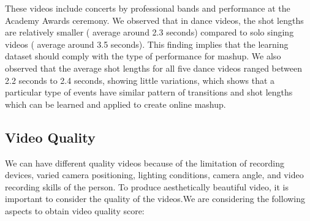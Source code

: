 \documentclass{clsfile}
\begin{document}
These videos include concerts by professional bands and performance at the Academy Awards ceremony. We observed that in dance videos, the shot lengths are relatively smaller ( average around 2.3 seconds) compared to solo singing videos ( average around 3.5 seconds). This ﬁnding implies that the learning dataset should comply with the type of performance for mashup. We also observed that the average shot lengths for all ﬁve dance videos ranged between 2.2 seconds to 2.4 seconds, showing little variations, which shows that a particular type of events have similar pattern of transitions and shot lengths which can be learned and applied to create online mashup. 

\subsection{Video Quality}
We can have different quality videos because of the limitation of
recording devices, varied camera positioning, lighting conditions,
camera angle, and video recording skills of the person. To produce
aesthetically beautiful video, it is important to consider the quality
of the videos.We are considering the following aspects to obtain
video quality score:
\end{document}
